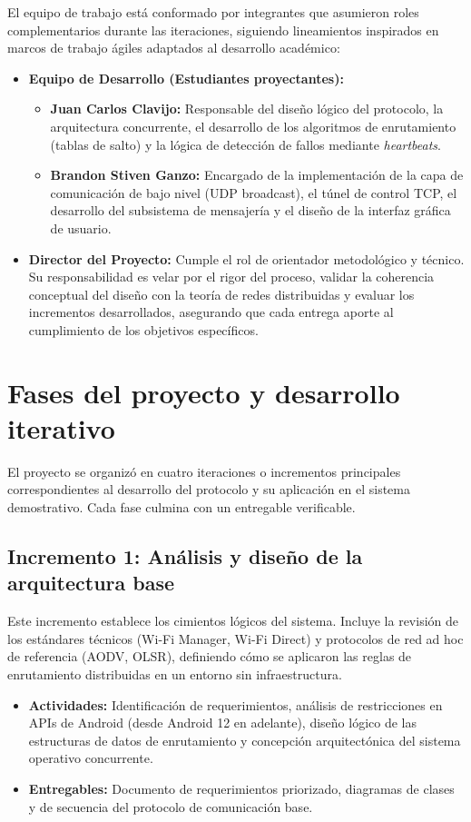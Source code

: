 \documentclass[12pt,oneside]{scrreprt}
\begin{document}
El equipo de trabajo está conformado por integrantes que asumieron roles complementarios durante las iteraciones, siguiendo lineamientos inspirados en marcos de trabajo ágiles adaptados al desarrollo académico:

\begin{itemize}
    \item \textbf{Equipo de Desarrollo (Estudiantes proyectantes):}
        \begin{itemize}
            \item \textbf{Juan Carlos Clavijo:} Responsable del diseño lógico del protocolo, la arquitectura concurrente, el desarrollo de los algoritmos de enrutamiento (tablas de salto) y la lógica de detección de fallos mediante \textit{heartbeats}.
            \item \textbf{Brandon Stiven Ganzo:} Encargado de la implementación de la capa de comunicación de bajo nivel (UDP broadcast), el túnel de control TCP, el desarrollo del subsistema de mensajería y el diseño de la interfaz gráfica de usuario.
        \end{itemize}
    \item \textbf{Director del Proyecto:} Cumple el rol de orientador metodológico y técnico. Su responsabilidad es velar por el rigor del proceso, validar la coherencia conceptual del diseño con la teoría de redes distribuidas y evaluar los incrementos desarrollados, asegurando que cada entrega aporte al cumplimiento de los objetivos específicos.
\end{itemize}

\section{Fases del proyecto y desarrollo iterativo}

El proyecto se organizó en cuatro iteraciones o incrementos principales correspondientes al desarrollo del protocolo y su aplicación en el sistema demostrativo. Cada fase culmina con un entregable verificable.

\subsection{Incremento 1: Análisis y diseño de la arquitectura base}
Este incremento establece los cimientos lógicos del sistema. Incluye la revisión de los estándares técnicos (Wi-Fi Manager, Wi-Fi Direct) y protocolos de red ad hoc de referencia (AODV, OLSR), definiendo cómo se aplicaron las reglas de enrutamiento distribuidas en un entorno sin infraestructura.
\begin{itemize}
    \item \textbf{Actividades:} Identificación de requerimientos, análisis de restricciones en APIs de Android (desde Android 12 en adelante), diseño lógico de las estructuras de datos de enrutamiento y concepción arquitectónica del sistema operativo concurrente.
    \item \textbf{Entregables:} Documento de requerimientos priorizado, diagramas de clases y de secuencia del protocolo de comunicación base.
\end{itemize}
\end{document}
